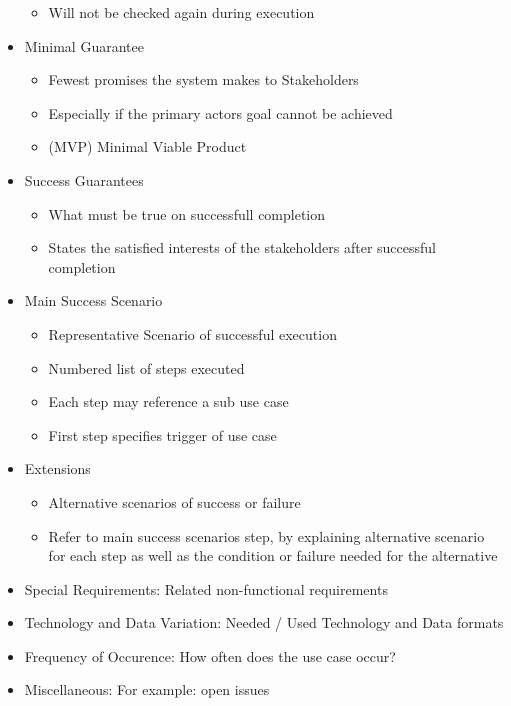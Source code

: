 \documentclass[
../../Software_Engineering_Summary.tex,
]
{subfiles}
\begin{document}
\begin{greenbox}
\begin{itemize}
\begin{itemize}
            \item Will not be checked again during execution
        \end{itemize}
        \item Minimal Guarantee
        \begin{itemize}
            \item Fewest promises the system makes to Stakeholders
            \item Especially if the primary actors goal cannot be achieved
            \item (MVP) Minimal Viable Product
        \end{itemize}
        \item Success Guarantees
        \begin{itemize}
            \item What must be true on successfull completion
            \item States the satisfied interests of the stakeholders after successful completion
        \end{itemize}
        \item Main Success Scenario
        \begin{itemize}
            \item Representative Scenario of successful execution
            \item Numbered list of steps executed
            \item Each step may reference a sub use case
            \item First step specifies trigger of use case
        \end{itemize}
        \item Extensions
        \begin{itemize}
            \item Alternative scenarios of success or failure
            \item Refer to main success scenarios step, by explaining alternative scenario for each step as well as the condition or failure needed for the alternative
        \end{itemize}
        \item Special Requirements: Related non-functional requirements
        \item Technology and Data Variation: Needed / Used Technology and Data formats
        \item Frequency of Occurence: How often does the use case occur?
        \item Miscellaneous: For example: open issues
    \end{itemize}
\end{greenbox}
\end{document}
